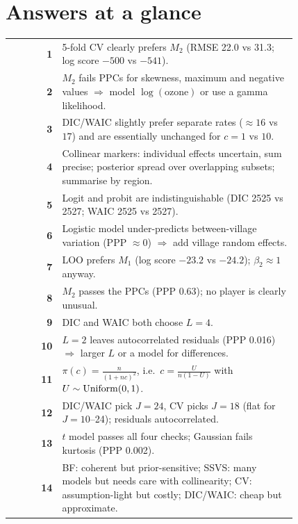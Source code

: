 \documentclass[11pt]{article}
\begin{document}

\tableofcontents
\clearpage

\section*{Answers at a glance}
\begin{center}
\small
\renewcommand{\arraystretch}{1.25}
\begin{tabular}{>{\bfseries\color{navy}}r p{0.82\linewidth}}\toprule
1  & 5-fold CV clearly prefers $M_2$ (RMSE 22.0 vs 31.3; log score $-500$ vs $-541$).\\
2  & $M_2$ fails PPCs for skewness, maximum and negative values $\Rightarrow$ model $\log(\text{ozone})$ or use a gamma likelihood.\\
3  & DIC/WAIC slightly prefer separate rates ($\approx16$ vs $17$) and are essentially unchanged for $c=1$ vs $10$.\\
4  & Collinear markers: individual effects uncertain, sum precise; posterior spread over overlapping subsets; summarise by region.\\
5  & Logit and probit are indistinguishable (DIC 2525 vs 2527; WAIC 2525 vs 2527).\\
6  & Logistic model under-predicts between-village variation (PPP $\approx0$) $\Rightarrow$ add village random effects.\\
7  & LOO prefers $M_1$ (log score $-23.2$ vs $-24.2$); $\beta_2\approx1$ anyway.\\
8  & $M_2$ passes the PPCs (PPP 0.63); no player is clearly unusual.\\
9  & DIC and WAIC both choose $L=4$.\\
10 & $L=2$ leaves autocorrelated residuals (PPP 0.016) $\Rightarrow$ larger $L$ or a model for differences.\\
11 & $\pi(c)=\frac{n}{(1+nc)^2}$, i.e.\ $c=\frac{U}{n(1-U)}$ with $U\sim\mathrm{Uniform}(0,1)$.\\
12 & DIC/WAIC pick $J=24$, CV picks $J=18$ (flat for $J=10$--24); residuals autocorrelated.\\
13 & $t$ model passes all four checks; Gaussian fails kurtosis (PPP 0.002).\\
14 & BF: coherent but prior-sensitive; SSVS: many models but needs care with collinearity; CV: assumption-light but costly; DIC/WAIC: cheap but approximate.\\\bottomrule
\end{tabular}
\end{center}
\clearpage
\end{document}
